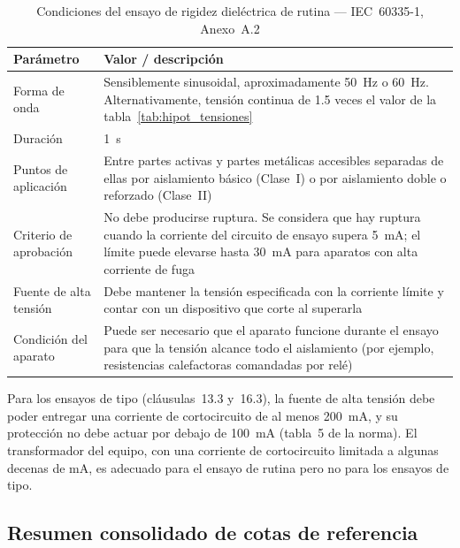 \begin{table}[H]
\centering
\caption{Condiciones del ensayo de rigidez dieléctrica de rutina --- IEC~60335-1, Anexo~A.2}
\label{tab:hipot_condiciones}
\renewcommand{\arraystretch}{1.35}
\begin{tabular}{@{} p{4.5cm} p{8cm} @{}}
\toprule
\textbf{Parámetro} & \textbf{Valor / descripción} \\
\midrule
Forma de onda
    & Sensiblemente sinusoidal, aproximadamente \SI{50}{\hertz} o
      \SI{60}{\hertz}. Alternativamente, tensión continua de \num{1.5}
      veces el valor de la tabla~\ref{tab:hipot_tensiones} \\
\addlinespace
Duración
    & \SI{1}{\second} \\
\addlinespace
Puntos de aplicación
    & Entre partes activas y partes metálicas accesibles separadas
      de ellas por aislamiento básico (Clase~I) o por aislamiento doble
      o reforzado (Clase~II) \\
\addlinespace
Criterio de aprobación
    & No debe producirse ruptura. Se considera que hay ruptura cuando
      la corriente del circuito de ensayo supera \SI{5}{\milli\ampere};
      el límite puede elevarse hasta \SI{30}{\milli\ampere} para aparatos
      con alta corriente de fuga \\
\addlinespace
Fuente de alta tensión
    & Debe mantener la tensión especificada con la corriente límite y
      contar con un dispositivo que corte al superarla \\
\addlinespace
Condición del aparato
    & Puede ser necesario que el aparato funcione durante el ensayo
      para que la tensión alcance todo el aislamiento (por ejemplo,
      resistencias calefactoras comandadas por relé) \\
\bottomrule
\end{tabular}
\end{table}

\noindent Para los ensayos de tipo (cláusulas~13.3 y~16.3), la fuente de alta
tensión debe poder entregar una corriente de cortocircuito de al menos
\SI{200}{\milli\ampere}, y su protección no debe actuar por debajo de
\SI{100}{\milli\ampere} (tabla~5 de la norma).
El transformador del equipo, con una corriente de cortocircuito limitada
a algunas decenas de \si{\milli\ampere}, es adecuado para el ensayo de
rutina pero no para los ensayos de tipo.

\subsection{Resumen consolidado de cotas de referencia}
\label{subsec:tabla_resumen}


